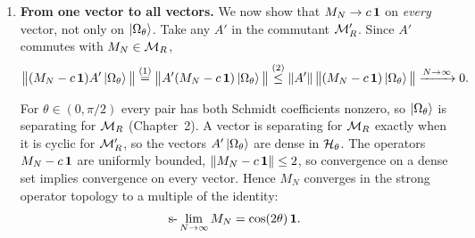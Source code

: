 \begin{keyresult}[: No normalized trace away from $\theta=\pi/4$]
\begin{enumerate}[leftmargin=*]
So the average magnetization has expectation value
\[
\braket{\Omega_\theta | M_N | \Omega_\theta} = \frac{1}{N}\sum_{k=1}^N \cos(2\theta) = \cos(2\theta) .
\]
Write $c\equiv\cos(2\theta)$. The state $\ket{\Phi_\theta}$ is a product over pairs, so the fluctuations at
different sites $k \ne j$ are uncorrelated. At the same site, $(\sigma_z^{(k)})^2=\id$. Together these give
\[
\Braket{\Omega_\theta \Big| \big(\sigma_z^{(k)} - c\big)\big(\sigma_z^{(j)} - c\big) \Big| \Omega_\theta}
= \delta_{kj}\big(1 - c^2\big) = \delta_{kj}\sin^2(2\theta) .
\]
The variance of $M_N$ in the GNS vector is then
\begin{align}
\big\| \big(M_N - c\,\id\big)\ket{\Omega_\theta} \big\|^2
\eqstep{1} \frac{1}{N^2}\sum_{k,j=1}^N \delta_{kj}\sin^2(2\theta)
\eqstep{2} \frac{\sin^2(2\theta)}{N} \xrightarrow{N\to\infty} 0 . \notag
\end{align}
\quad
{}

This is the law of large numbers for $N$ independent spins. The average of many independent measurements of
$\sigma_z$ settles to its mean $c$, with fluctuations of order $1/\sqrt N$.

\item \textbf{From one vector to all vectors.}
We now show that $M_N\to c\,\mathbf{1}$ on \emph{every} vector, not only on $\ket{\Omega_\theta}$. Take any $A'$ in
the commutant $\mathcal{M}_R'$. Since $A'$ commutes with $M_N\in\mathcal{M}_R$,
\begin{align}
\big\|(M_N - c\,\mathbf{1})A'\ket{\Omega_\theta}\big\|
\overset{(1)}{=} \big\|A'(M_N - c\,\mathbf{1})\ket{\Omega_\theta}\big\|
\overset{(2)}{\le} \|A'\|\,\big\|(M_N - c\,\mathbf{1})\ket{\Omega_\theta}\big\| \xrightarrow{N\to\infty} 0 . \notag
\end{align}
\quad
{}

For $\theta\in(0,\pi/2)$ every pair has both Schmidt coefficients nonzero, so $\ket{\Omega_\theta}$ is
separating for $\mathcal{M}_R$ (Chapter~2). A vector is separating for $\mathcal{M}_R$ exactly when it is cyclic for $\mathcal{M}_R'$, so
the vectors $A'\ket{\Omega_\theta}$ are dense in $\mathcal{H}_\theta$. The operators $M_N-c\,\mathbf{1}$ are uniformly
bounded, $\|M_N-c\,\mathbf{1}\|\le2$, so convergence on a dense set implies convergence on every vector. Hence $M_N$
converges in the strong operator topology to a multiple of the identity:
\[
\mathrm{s\text{-}}\lim_{N\to\infty} M_N = \cos(2\theta)\,\mathbf{1} .
\]


\end{enumerate}
\end{keyresult}
